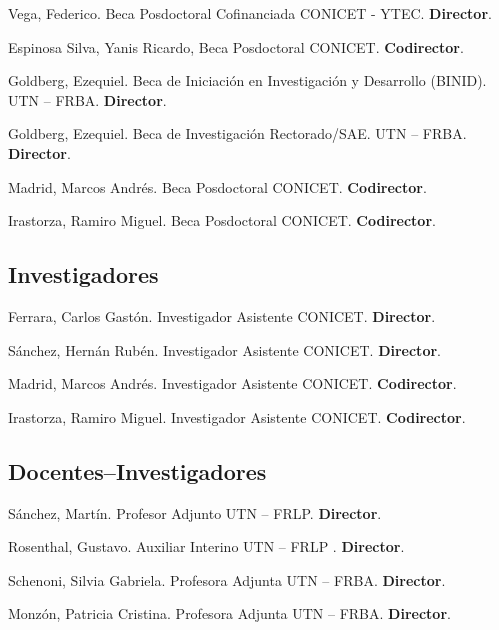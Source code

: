      Vega, Federico. Beca Posdoctoral Cofinanciada CONICET - YTEC. \textbf{Director}.

     Espinosa Silva, Yanis Ricardo, Beca Posdoctoral CONICET. \textbf{Codirector}.

     Goldberg, Ezequiel. Beca de Iniciación en Investigación y Desarrollo (BINID). UTN -- FRBA. \textbf{Director}.

     Goldberg, Ezequiel. Beca de Investigación Rectorado/SAE. UTN -- FRBA. \textbf{Director}.

     Madrid, Marcos Andrés. Beca Posdoctoral CONICET. \textbf{Codirector}.

     Irastorza, Ramiro Miguel. Beca Posdoctoral CONICET. \textbf{Codirector}.

\subsection{Investigadores}
 Ferrara, Carlos Gastón. Investigador Asistente CONICET. \textbf{Director}.

 Sánchez, Hernán Rubén. Investigador Asistente CONICET. \textbf{Director}.

     Madrid, Marcos Andrés. Investigador Asistente CONICET. \textbf{Codirector}.

     Irastorza, Ramiro Miguel. Investigador Asistente CONICET. \textbf{Codirector}.
  
\subsection{Docentes--Investigadores}
 Sánchez, Martín. Profesor Adjunto UTN -- FRLP. \textbf{Director}.
  
   Rosenthal, Gustavo. Auxiliar Interino UTN -- FRLP . \textbf{Director}.
  
   Schenoni, Silvia Gabriela. Profesora Adjunta UTN -- FRBA. \textbf{Director}.
  
   Monzón, Patricia Cristina. Profesora Adjunta UTN -- FRBA. \textbf{Director}.
  

